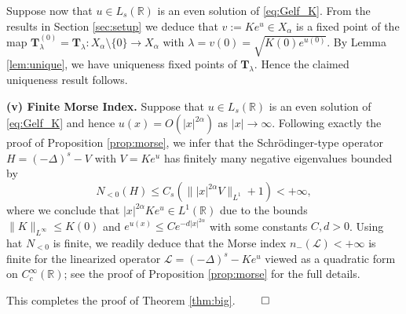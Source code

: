 \documentclass[reqno,10pt,a4paper]{amsart}
\theoremstyle{definition}
\theoremstyle{definition}
\theoremstyle{remark}
\theoremstyle{remark}
\numberwithin{equation}{section}
\newcommand{\R}{\mathbb{R}}
\newcommand{\Ds}{(-\Delta)^{s}}
\newcommand{\Ts}{\mathbf{T}}
\newcommand{\LL}{\mathcal{L}}
\begin{document}
Suppose now that $u \in L_s(\R)$ is an even solution of \eqref{eq:Gelf_K}. From the results in Section \ref{sec:setup} we deduce that $v := K e^u \in X_\alpha$ is a fixed point of the map $\Ts_{\lambda}^{(0)}= \Ts_{\lambda} : X_\alpha \setminus \{ 0 \} \to X_\alpha$ with $\lambda = v(0) = \sqrt{K(0) e^{u(0)}}$. By Lemma \ref{lem:unique}, we have uniqueness fixed points of $\Ts_\lambda$. Hence the claimed uniqueness result follows.

\medskip
\textbf{(v) Finite Morse Index.} Suppose that $u \in L_s(\R)$ is an even solution of \eqref{eq:Gelf_K} and hence $u(x) = O(|x|^{2 \alpha})$ as $|x| \to \infty$. Following exactly the proof of Proposition \ref{prop:morse}, we infer that the Schr\"odinger-type operator $H=\Ds-V$ with $V = K e^u$ has finitely many negative eigenvalues bounded by
$$
N_{<0}(H) \leq C_s ( \| |x|^{2 \alpha} V \|_{L^1} + 1) < +\infty,
$$
where we conclude that $|x|^{2 \alpha} K e^u \in L^1(\R)$ due to the bounds $\| K \|_{L^\infty} \leq K(0)$ and $e^{u(x)} \leq C e^{-d |x|^{2 \alpha}}$ with some constants $C, d > 0$. Using hat $N_{<0}$ is finite, we readily deduce that the Morse index $n_-(\LL) < +\infty$ is finite for the linearized operator $\LL = \Ds-K e^u$ viewed as a quadratic form on $C^\infty_c(\R)$; see the proof of Proposition \ref{prop:morse} for the full details. 

This completes the proof of Theorem \ref{thm:big}. \hfill $\qed$
\end{document}
